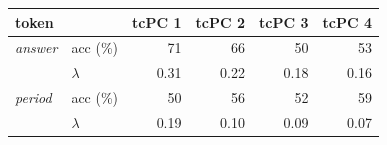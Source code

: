     \begin{tabular}{llrrrr}
    \toprule
    token & & tcPC 1 & tcPC 2 & tcPC 3 & tcPC 4 \\
    \midrule
    \textit{answer} & acc (\%) & 71 & 66 & 50 & 53 \\
     & $\lambda$ & 0.31 & 0.22 & 0.18 & 0.16 \\
    \textit{period} & acc (\%) & 50 & 56 & 52 & 59 \\
     & $\lambda$ & 0.19 & 0.10 & 0.09 & 0.07 \\
    \bottomrule
    \end{tabular}
